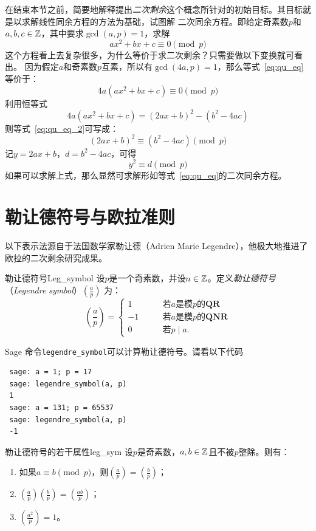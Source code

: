   在结束本节之前，简要地解释提出\emph{二次剩余}这个概念所针对的初始目标。其目标就是以求解线性同余方程的方法为基础，试图解
  二次同余方程。即给定奇素数$p$和$a, b, c \in {\mathbb Z}$，其中要求$\gcd(a,p)=1$，求解
  \begin{equation}
  \label{eq:qu_eq}
  a x^2 + bx + c \equiv 0 \pmod{p}
  \end{equation}
  这个方程看上去复杂很多，为什么等价于求二次剩余？只需要做以下变换就可看出。
  因为假定$a$和奇素数$p$互素，所以有$\gcd(4a,p)=1$，那么等式~\ref{eq:qu_eq}等价于：
  \begin{equation}
    \label{eq:qu_eq_2}
    4a(a x^2 + bx + c) \equiv 0 \pmod{p}
  \end{equation}
  利用恒等式
  \[  4a(a x^2 + bx + c)  = (2ax + b)^2 - (b^2 - 4ac)\]
  则等式~\ref{eq:qu_eq_2}可写成：
  \[(2ax + b)^2 \equiv (b^2 - 4ac) \pmod{p}\]
  记$y = 2ax + b$，$d = b^2 - 4ac$，可得
  \[y^2 \equiv d \pmod{p}\]
  如果可以求解上式，那么显然可求解形如等式~\ref{eq:qu_eq}的二次同余方程。
  
  \section{勒让德符号与欧拉准则}
  以下表示法源自于法国数学家勒让德（Adrien Marie Legendre），他极大地推进了欧拉的二次剩余研究成果。
	 \begin{definition}{勒让德符号}{Leg_symbol}
 设$p$是一个奇素数，并设$n \in {\mathbb Z}$。定义\emph{勒让德符号}（\emph{Legendre symbol}）$(\frac{a}{p})$ 为：
 \[\left(\frac{a}{p}\right) = 
 \begin{cases}
 1 & \qquad \text{若} a \text{是模} p \text{的}\mathbf{QR}\\
 -1 & \qquad \text{若} a \text{是模} p \text{的}\mathbf{QNR}\\
 0 & \qquad \text{若} p \mid a.
 \end{cases}\] 
 \end{definition}

	 Sage 命令\lstinline|legendre_symbol|可以计算勒让德符号。请看以下代码
 \begin{example}
 \begin{lstlisting}
 sage: a = 1; p = 17
 sage: legendre_symbol(a, p)
 1
 sage: a = 131; p = 65537
 sage: legendre_symbol(a, p)
 -1
 \end{lstlisting}
\end{example}
  
  \begin{proposition}{勒让德符号的若干属性}{leg_sym}
   设$p$是奇素数，$a, b \in {\mathbb Z}$且不被$p$整除。则有：
   \begin{enumerate}
   \item 如果$a \equiv b \pmod{p}$，则$\left(\frac{a}{p} \right) = \left(\frac{b}{p} \right)$；
   
   \item $\left(\frac{a}{p} \right) \left(\frac{b}{p} \right) = \left(\frac{ab}{p} \right)$；
   
   \item $\left(\frac{a^2}{p} \right) = 1$。
   \end{enumerate}
   \end{proposition}
   
